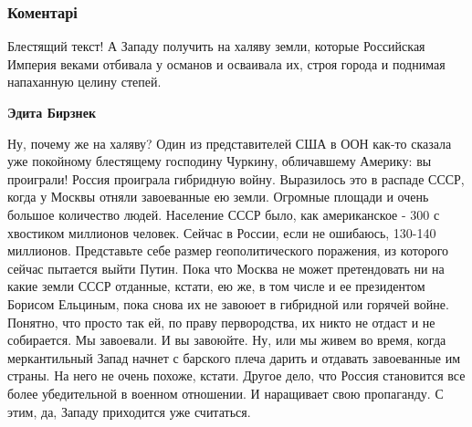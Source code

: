  
 
 
 
 
\subsubsection{Коментарі}

\begin{itemize}
 

Блестящий текст! А Западу получить на халяву земли, которые Российская Империя
веками отбивала у османов и осваивала их, строя города и поднимая напаханную
целину степей.

\begin{itemize}
 
\textbf{Эдита Бирзнек} 

Ну, почему же на халяву? Один из представителей США в
ООН как-то сказала уже покойному блестящему господину Чуркину, обличавшему
Америку: вы проиграли! Россия проиграла гибридную войну. Выразилось это в
распаде СССР, когда у Москвы отняли завоеванные ею земли. Огромные площади и
очень большое количество людей. Население СССР было, как американское - 300 с
хвостиком миллионов человек. Сейчас в России, если не ошибаюсь, 130-140
миллионов. Представьте себе размер геополитического поражения, из которого
сейчас пытается выйти Путин. Пока что Москва не может претендовать ни на какие
земли СССР отданные, кстати, ею же, в том числе и ее президентом Борисом
Ельциным, пока снова их не завоюет в гибридной или горячей войне. Понятно, что
просто так ей, по праву первородства, их никто не отдаст и не собирается. Мы
завоевали. И вы завоюйте. Ну, или мы живем во время, когда меркантильный Запад
начнет с барского плеча дарить и отдавать завоеванные им страны. На него не
очень похоже, кстати. Другое дело, что Россия становится все более убедительной
в военном отношении. И наращивает свою пропаганду. С этим, да, Западу
приходится уже считаться.


\end{itemize}
\end{itemize}
